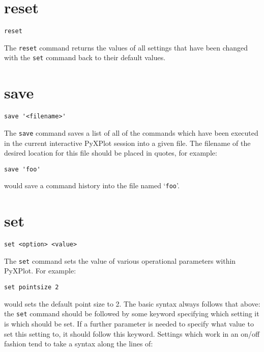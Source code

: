 \documentclass[a4paper,onecolumn,11pt]{book}
\begin{document}
\section{reset}

\begin{verbatim}
reset
\end{verbatim}

The {\tt reset} command returns the values of all settings that have been
changed with the {\tt set} command back to their default values.


\section{save}

\begin{verbatim}
save '<filename>'
\end{verbatim}

The {\tt save} command saves a list of all of the commands which have been
executed in the current interactive PyXPlot session into a given file. The
filename of the desired location for this file should be placed in quotes, for
example:

\begin{verbatim}
save 'foo'
\end{verbatim}

\noindent would save a command history into the file named `{\tt foo}'.


\section{set}

\begin{verbatim}
set <option> <value>
\end{verbatim}

The {\tt set} command sets the value of various operational parameters within
PyXPlot.  For example:

\begin{verbatim}
set pointsize 2
\end{verbatim}

\noindent would sets the default point size to 2. The basic syntax always
follows that above: the {\tt set} command should be followed by some keyword
specifying which setting it is which should be set. If a further parameter is
needed to specify what value to set this setting to, it should follow this
keyword. Settings which work in an on/off fashion tend to take a syntax along
the lines of:
\end{document}

